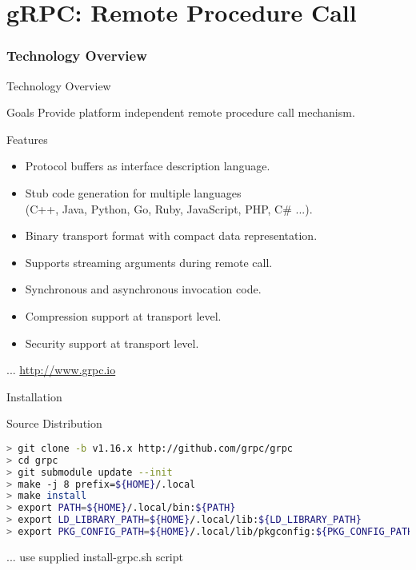 \part{gRPC: Remote Procedure Call}


\section{Technology Overview}


\begin{frame}{Technology Overview}
    \begin{block}{Goals}
        Provide platform independent remote procedure call mechanism.
    \end{block}

    \bigskip

    \begin{block}{Features}
        \begin{itemize}
            \item Protocol buffers as interface description language.
            \item Stub code generation for multiple languages \\
                  (C++, Java, Python, Go, Ruby, JavaScript, PHP, C\# ...).
            \item Binary transport format with compact data representation.
            \item Supports streaming arguments during remote call.
            \item Synchronous and asynchronous invocation code.
            \item Compression support at transport level.
            \item Security support at transport level.
        \end{itemize}
    \end{block}

    \bigskip

    \hfill ... \url{http://www.grpc.io}
\end{frame}


\begin{frame}[fragile]{Installation}
    \begin{block}{Source Distribution}
\begin{lstlisting}[language=bash,style=mini]
> git clone -b v1.16.x http://github.com/grpc/grpc
> cd grpc
> git submodule update --init
> make -j 8 prefix=${HOME}/.local
> make install
> export PATH=${HOME}/.local/bin:${PATH}
> export LD_LIBRARY_PATH=${HOME}/.local/lib:${LD_LIBRARY_PATH}
> export PKG_CONFIG_PATH=${HOME}/.local/lib/pkgconfig:${PKG_CONFIG_PATH}
\end{lstlisting}
    \end{block}

    \bigskip

    \hfill ... use supplied install-grpc.sh script
\end{frame}


